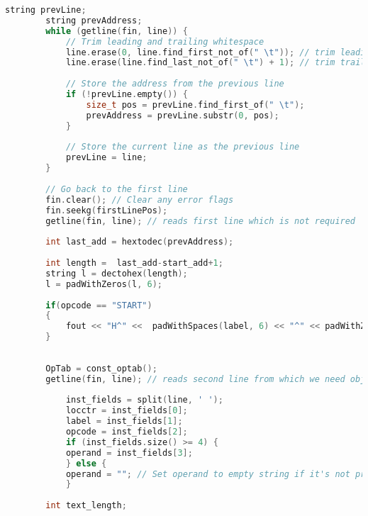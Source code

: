 \documentclass[12pt]{article}
\begin{document}
\begin{lstlisting}[language=C++, caption={Pass 2 - Object Code Generator}]
        string prevLine;
        string prevAddress;
        while (getline(fin, line)) {
            // Trim leading and trailing whitespace
            line.erase(0, line.find_first_not_of(" \t")); // trim leading whitespace
            line.erase(line.find_last_not_of(" \t") + 1); // trim trailing whitespace
    
            // Store the address from the previous line
            if (!prevLine.empty()) {
                size_t pos = prevLine.find_first_of(" \t");
                prevAddress = prevLine.substr(0, pos);
            }
    
            // Store the current line as the previous line
            prevLine = line;
        }  
    
        // Go back to the first line
        fin.clear(); // Clear any error flags
        fin.seekg(firstLinePos);
        getline(fin, line); // reads first line which is not required
      
        int last_add = hextodec(prevAddress);
    
        int length =  last_add-start_add+1;
        string l = dectohex(length);
        l = padWithZeros(l, 6);
    
        if(opcode == "START")
        {
            fout << "H^" <<  padWithSpaces(label, 6) << "^" << padWithZeros(locctr, 6) << "^" <<  l;
        }
    
    
        OpTab = const_optab();
        getline(fin, line); // reads second line from which we need object code
            
            inst_fields = split(line, ' ');
            locctr = inst_fields[0];
            label = inst_fields[1];
            opcode = inst_fields[2];
            if (inst_fields.size() >= 4) {
            operand = inst_fields[3];
            } else {
            operand = ""; // Set operand to empty string if it's not present
            }
    
        int text_length;
    

\end{lstlisting}
\end{document}
